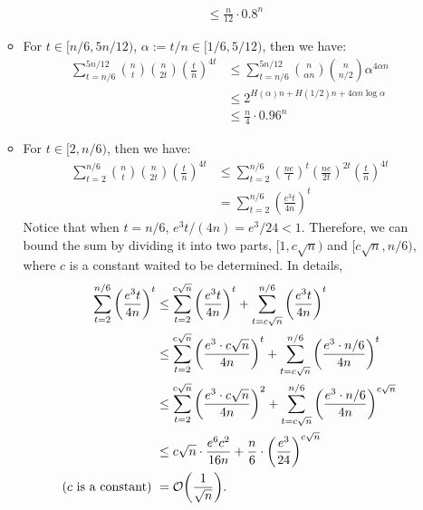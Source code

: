 \begin{answer}
\begin{enumerate}[label=\alph*).]
\begin{itemize}
\begin{align*}
                &\le \frac{n}{12} \cdot 0.8^n 
            \end{align*}
            \item For $t \in [n/6, 5n/12)$, $\alpha := t / n \in [1/6, 5/12)$, then we have:
            \begin{align*}
                \sum_{t=n/6}^{5n/12} \binom{n}{t} \binom{n}{2t} \left(\frac{t}{n}\right)^{4t} &\le \sum_{t=n/6}^{5n/12} \binom{n}{\alpha n} \binom{n}{n/2} \alpha^{4\alpha n} \\ 
                &\le 2^{H(\alpha) n + H(1/2) n + 4\alpha n \log \alpha} \\
                &\le \frac{n}{4} \cdot 0.96^n
            \end{align*} 
            \item For $t \in [2, n/6)$, then we have:
            \begin{align*}
                \sum_{t= 2}^{n/6} \binom{n}{t} \binom{n}{2t} \left(\frac{t}{n}\right)^{4t} &\le \sum_{t= 2}^{n/6} \left(\frac{ne}{t}\right)^t \left(\frac{ne}{2t}\right)^{2t} \left(\frac{t}{n}\right)^{4t} \\
                &= \sum_{t= 2}^{n/6} \left(\frac{e^3 t}{4n}\right)^t %
            \end{align*}
            Notice that when $t = n /6$, $e^3 t / (4n) = e^3 / 24 < 1$. Therefore, we can bound the sum by dividing it into two parts, $[1, c\sqrt{n})$ and $[c\sqrt{n}, n/6)$, where $c$ is a constant waited to be determined. In details,
            \begin{align*}
                \sum_{t=2}^{n/6} \left(\frac{e^3 t}{4n}\right)^t &\le \sum_{t=2}^{c\sqrt{n}} \left(\frac{e^3 t}{4n}\right)^t + \sum_{t=c\sqrt{n}}^{n/6} \left(\frac{e^3 t}{4n}\right)^t \\
                &\le  \sum_{t=2}^{c\sqrt{n}} \left(\frac{e^3\cdot c\sqrt{n}}{4n}\right)^t  + \sum_{t=c\sqrt{n}}^{n/6} \left(\frac{e^3 \cdot n / 6}{4n}\right)^t \\
                &\le \sum_{t=2}^{c\sqrt{n}} \left(\frac{e^3\cdot c\sqrt{n}}{4n}\right)^2  + \sum_{t=c\sqrt{n}}^{n/6} \left(\frac{e^3 \cdot n / 6}{4n}\right)^{c\sqrt{n}} \\
                &\le c\sqrt{n}\cdot \frac{e^6 c^2}{16 n} + \frac{n}{6} \cdot \left(\frac{e^3}{24}\right)^{c\sqrt{n}} \\
                \text{($c$ is a constant) }&= \order{\frac{1}{\sqrt{n}}}.
            \end{align*}

\end{itemize}
\end{enumerate}
\end{answer}
